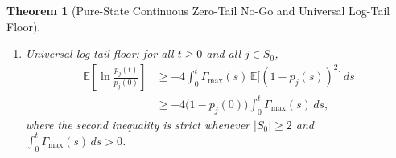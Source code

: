 \documentclass[aps,pra,10pt,twocolumn,superscriptaddress,amsmath,amssymb,floatfix]{revtex4-2}
\newtheorem{theorem}{Theorem}
\newcommand{\E}{\mathbb{E}}
\newcommand{\Prob}{\mathbb{P}}
\begin{document}
\begin{theorem}[Pure-State Continuous Zero-Tail No-Go and Universal Log-Tail Floor]
\begin{enumerate}
\begin{equation}
\label{eq:nonattain}
\Prob\bigl(p_j(t) > 0 \text{ for all } t \in [0,\infty)\bigr) = 1.
\end{equation}
\item[(d)] \emph{Universal log-tail floor:} for all $t \ge 0$ and all $j \in S_0$,
\begin{align}
\label{eq:logfloor}
\E\!\left[\ln\frac{p_j(t)}{p_j(0)}\right] &\ge -4\int_0^t \Gamma_{\max}(s)\,\E\bigl[(1-p_j(s))^2\bigr]\,ds \nonumber\\
&\ge -4\bigl(1-p_j(0)\bigr)\int_0^t \Gamma_{\max}(s)\,ds,
\end{align}
where the second inequality is strict whenever $|S_0| \ge 2$ and $\int_0^t \Gamma_{\max}(s)\,ds > 0$.
\end{enumerate}
\end{theorem}
\end{document}
